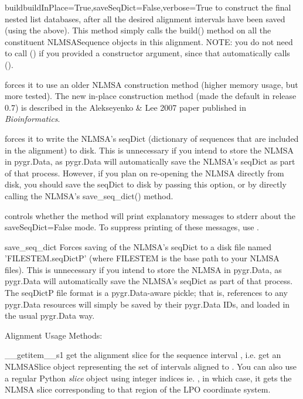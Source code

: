 \documentclass{howto}
\begin{document}
\begin{funcdesc}{build}{buildInPlace=True,saveSeqDict=False,verbose=True}
  to construct the final nested list databases,
  after all the desired alignment intervals have been saved (using the
   above).  This method
  simply calls the build() method on all the constituent NLMSASequence objects
  in this alignment.  NOTE: you do not need to call () if
  you provided a  constructor argument, since that automatically
  calls ().

   forces it to use an older NLMSA construction method
  (higher memory usage, but more tested).  The new in-place construction method
  (made the default in release 0.7) is described in the Alekseyenko \& Lee 2007
  paper published in {\em Bioinformatics}.

   forces it to write the NLMSA's seqDict (dictionary
  of sequences that are included in the alignment) to disk.  This is unnecessary
  if you intend to store the NLMSA in pygr.Data, as pygr.Data will automatically
  save the NLMSA's seqDict as part of that process.  However, if you plan on
  re-opening the NLMSA directly from disk, you should save the seqDict 
  to disk by passing this option, or by directly calling the NLMSA's
  save_seq_dict() method.

   controls whether the method will print explanatory 
  messages to stderr about the saveSeqDict=False mode.
  To suppress printing of these messages, use .
\end{funcdesc}

\begin{funcdesc}{save_seq_dict}{}
  Forces saving of the NLMSA's seqDict to a disk file named 'FILESTEM.seqDictP'
  (where FILESTEM is the base path to your NLMSA files).  This is unnecessary
  if you intend to store the NLMSA in pygr.Data, as pygr.Data will automatically
  save the NLMSA's seqDict as part of that process.  The seqDictP file format
  is a pygr.Data-aware pickle; that is, references to any pygr.Data resources
  will simply be saved by their pygr.Data IDs, and loaded in the usual
  pygr.Data way.
\end{funcdesc}



Alignment Usage Methods:

\begin{funcdesc}{__getitem__}{s1}
  get the alignment slice for the sequence interval ,
  i.e. get an NLMSASlice object representing the set of intervals aligned to .
  You can also use a regular Python {\em slice} object using integer indices
  ie. , in which case, it gets the NLMSA slice corresponding to that 
  region of the LPO coordinate system.
\end{funcdesc}
\end{document}
